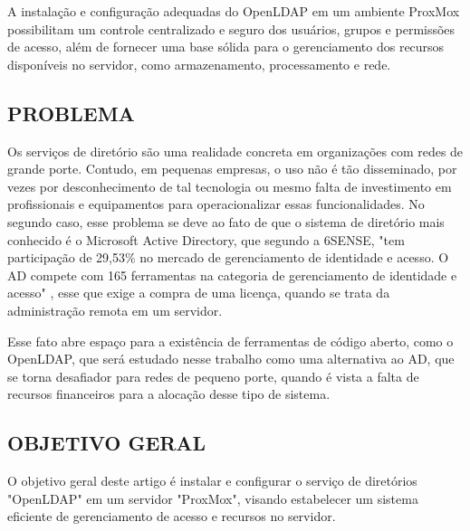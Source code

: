 A instalação e configuração adequadas do OpenLDAP em um ambiente ProxMox possibilitam um controle centralizado e seguro dos usuários, grupos e permissões de acesso, além de fornecer uma base sólida para o gerenciamento dos recursos disponíveis no servidor, como armazenamento, processamento e rede.


\subsection{PROBLEMA}
\label{subsec:problema}
Os serviços de diretório são uma realidade concreta em organizações com redes de grande porte. Contudo, em pequenas empresas, o uso não é tão disseminado, por vezes por desconhecimento de tal tecnologia ou mesmo falta de investimento em profissionais e equipamentos para operacionalizar essas funcionalidades. No segundo caso, esse problema se deve ao fato de que o sistema de diretório mais conhecido é o Microsoft Active Directory, que segundo a 6SENSE, "tem participação de 29,53\% no mercado de gerenciamento de identidade e acesso. O AD compete com 165 ferramentas na categoria de gerenciamento de identidade e acesso" \cite{6sense}, esse que exige a compra de uma licença, quando se trata da administração remota em um servidor.

Esse fato abre espaço para a existência de ferramentas de código aberto, como o OpenLDAP, que será estudado nesse trabalho como uma alternativa ao AD, que se torna desafiador para redes de pequeno porte, quando é vista a falta de recursos financeiros para a alocação desse tipo de sistema.


\subsection{OBJETIVO GERAL}
\label{subsec:objetivo-geral}
O objetivo geral deste artigo é instalar e configurar o serviço de diretórios "OpenLDAP" em um servidor "ProxMox", visando estabelecer um sistema eficiente de gerenciamento de acesso e recursos no servidor.

